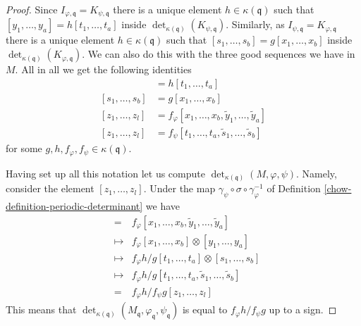 \begin{proof}
\medskip\noindent
Since $I_{\varphi, \mathfrak q} = K_{\psi, \mathfrak q}$
there is a unique element $h \in \kappa(\mathfrak q)$ such that
$[y_1, \ldots, y_a] = h [t_1, \ldots, t_a]$
inside $\det_{\kappa(\mathfrak q)}(K_{\psi, \mathfrak q})$.
Similarly, as $I_{\psi, \mathfrak q} = K_{\varphi, \mathfrak q}$
there is a unique element $h \in \kappa(\mathfrak q)$ such that
$[s_1, \ldots, s_b] = g [x_1, \ldots, x_b]$
inside $\det_{\kappa(\mathfrak q)}(K_{\varphi, \mathfrak q})$.
We can also do this with the three good sequences we have
in $M$. All in all we get the following identities
\begin{align*}
[y_1, \ldots, y_a]
& =
h [t_1, \ldots, t_a] \\
[s_1, \ldots, s_b]
& =
g [x_1, \ldots, x_b] \\
[z_1, \ldots, z_l]
& =
f_\varphi [x_1, \ldots, x_b, \tilde y_1, \ldots, \tilde y_a] \\
[z_1, \ldots, z_l]
& =
f_\psi [t_1, \ldots, t_a, \tilde s_1, \ldots, \tilde s_b]
\end{align*}
for some $g, h, f_\varphi, f_\psi \in \kappa(\mathfrak q)$.

\medskip\noindent
Having set up all this
notation let us compute $\det_{\kappa(\mathfrak q)}(M, \varphi, \psi)$.
Namely, consider the element $[z_1, \ldots, z_l]$.
Under the map $\gamma_\psi \circ \sigma \circ \gamma_\varphi^{-1}$
of Definition \ref{chow-definition-periodic-determinant} we have
\begin{eqnarray*}
[z_1, \ldots, z_l] & = &
f_\varphi [x_1, \ldots, x_b, \tilde y_1, \ldots, \tilde y_a] \\
& \mapsto & f_\varphi [x_1, \ldots, x_b] \otimes [y_1, \ldots, y_a] \\
& \mapsto &
f_\varphi h/g [t_1, \ldots, t_a] \otimes [s_1, \ldots, s_b] \\
& \mapsto &
f_\varphi h/g [t_1, \ldots, t_a, \tilde s_1, \ldots, \tilde s_b] \\
& = &
f_\varphi h/f_\psi g [z_1, \ldots, z_l]
\end{eqnarray*}
This means that
$\det_{\kappa(\mathfrak q)}
(M_{\mathfrak q}, \varphi_{\mathfrak q}, \psi_{\mathfrak q})$
is equal to $f_\varphi h/f_\psi g$ up to a sign.


\end{proof}
